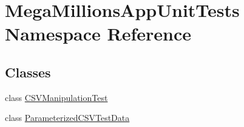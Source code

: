\hypertarget{namespace_mega_millions_app_unit_tests}{}\section{Mega\+Millions\+App\+Unit\+Tests Namespace Reference}
\label{namespace_mega_millions_app_unit_tests}
\subsection*{Classes}
\begin{DoxyCompactItemize}
\item 
class \hyperlink{class_mega_millions_app_unit_tests_1_1_c_s_v_manipulation_test}{C\+S\+V\+Manipulation\+Test}
\item 
class \hyperlink{class_mega_millions_app_unit_tests_1_1_parameterized_c_s_v_test_data}{Parameterized\+C\+S\+V\+Test\+Data}
\end{DoxyCompactItemize}
